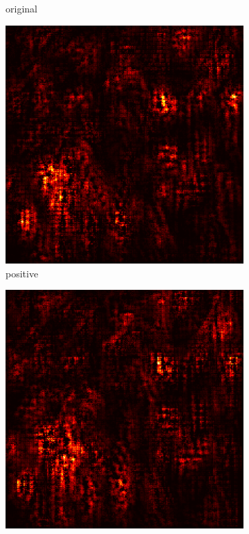 \documentclass[preprint,12pt]{elsarticle}
\begin{document}
\begin{figure}
\begin{subfigure}{0.14\linewidth}
        \caption{original}
    \end{subfigure}
    \hfill
    \begin{subfigure}{0.14\textwidth}
        \centering
        \includegraphics[width=\linewidth]{../visualizations/examples/imagenette/cnn/positive_saliency_map/7.png}
        \caption{positive}
    \end{subfigure}
    \hfill
    \begin{subfigure}{0.14\textwidth}
        \centering
        \includegraphics[width=\linewidth]{../visualizations/examples/imagenette/cnn/negative_saliency_map/7.png}

\end{subfigure}
\end{figure}
\end{document}
